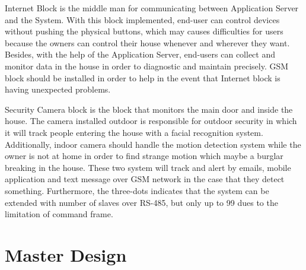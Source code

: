     Internet Block is the middle man for communicating between Application Server and the System. With this block implemented, end-user can control devices without pushing the physical buttons, which may causes difficulties for users because the owners can control their house whenever and wherever they want. Besides, with the help of the Application Server, end-users can collect and monitor data in the house in order to diagnostic and maintain precisely. GSM block should be installed in order to help in the event that Internet block is having unexpected problems.

    Security Camera block is the block that monitors the main door and inside the house. The camera installed outdoor is responsible for outdoor security in which it will track people entering the house with a facial recognition system. Additionally, indoor camera should handle the motion detection system while the owner is not at home in order to find strange motion which maybe a burglar breaking in the house. These two system will track and alert by emails, mobile application and text message over GSM network in the case that they detect something. Furthermore, the three-dots indicates that the system can be extended with number of slaves over RS-485, but only up to 99 dues to the limitation of command frame.
\section{Master Design}
